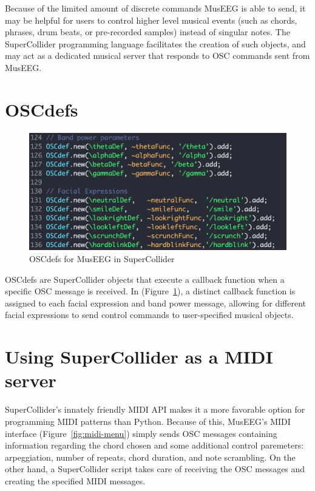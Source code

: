 Because of the limited amount of discrete commands MusEEG is able to send, it may be helpful for users to control higher level musical events (such as chords, phrases, drum beats, or pre-recorded samples) instead of singular notes. The SuperCollider programming language facilitates the creation of such objects, and may act as a dedicated musical server that responds to OSC commands sent from MusEEG. 

\section{OSCdefs}
\begin{figure}[htbp]
	\centering
		\includegraphics[width=1\columnwidth]{OSCdefs.png}
	\caption{OSCdefs for MusEEG in SuperCollider }
	\label{fig:oscdefs}
\end{figure}

OSCdefs are SuperCollider objects that execute a callback function when a specific OSC message is received. In (Figure~\ref{fig:oscdefs}), a distinct callback function is assigned to each facial expression and band power message, allowing for different facial expressions to send control commands to user-specified musical objects. 


\section{Using SuperCollider as a MIDI server}
SuperCollider's innately friendly MIDI API makes it a more favorable option for programming MIDI patterns than Python. Because of this, MusEEG's MIDI interface  (Figure~\ref{fig:midi-menu}) simply sends OSC messages containing information regarding the chord chosen and some additional control paremeters: arpeggiation, number of repeats, chord duration, and note scrambling. On the other hand, a SuperCollider script takes care of receiving the OSC messages and creating the specified MIDI messages. 

